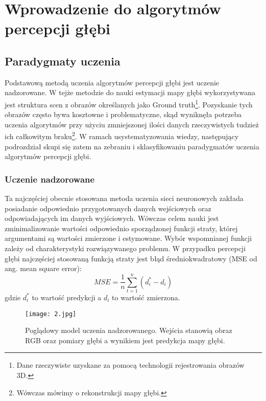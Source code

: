 \chapter{Wprowadzenie do algorytmów percepcji głębi}\label{chap:2_wprowadzenie_do_algorytmów_percepcji_głębi}

\section{Paradygmaty uczenia}
Podstawową metodą uczenia algorytmów percepcji głębi jest uczenie nadzorowane. W tejże metodzie do nauki estymacji mapy głębi wykorzystywana jest struktura scen z obrazów określanych jako Ground truth\footnote{Dane rzeczywiste uzyskane za pomocą technologii rejestrowania obrazów 3D.}. Pozyskanie tych obrazów często bywa kosztowne i problematyczne, skąd wyniknęła potrzeba uczenia algorytmów przy użyciu zmniejszonej ilości danych rzeczywistych tudzież ich całkowitym braku\footnote{Wówczas mówimy o rekonstrukcji mapy głębi.}. W ramach usystematyzowania wiedzy, następujący podrozdział skupi się zatem na zebraniu i sklasyfikowaniu paradygmatów uczenia algorytmów percepcji głębi.

\subsection{Uczenie nadzorowane}
Ta najczęściej obecnie stosowana metoda uczenia sieci neuronowych zakłada posiadanie odpowiednio przygotowanych danych wejściowych oraz odpowiadających im danych wyjściowych. Wówczas celem nauki jest zminimalizowanie wartości odpowiednio sporządzonej funkcji straty, której argumentami są wartości zmierzone i estymowane. Wybór wspomnianej funkcji zależy od charakterystyki rozwiązywanego problemu. W przypadku percepcji głębi najczęściej stosowaną funkcją straty jest błąd średniokwadratowy (MSE od ang. mean square error):
\begin{equation} \label{eq:1}
MSE = \frac{1}{n} \sum_{t=1}^{n} (d_i^* - d_i)
\end{equation}
gdzie \( d_i^* \) to wartość predykcji a \( d_i \) to wartość zmierzona.
\begin{figure}[H]
    \centering
    \texttt{[image: 2.jpg]}
    \caption{Poglądowy model uczenia nadzorowanego. Wejścia stanowią obraz RGB oraz pomiary głębi a wynikiem jest predykcja mapy głębi.}
    \label{fig:uczenie-nadzorowane}
\end{figure}

